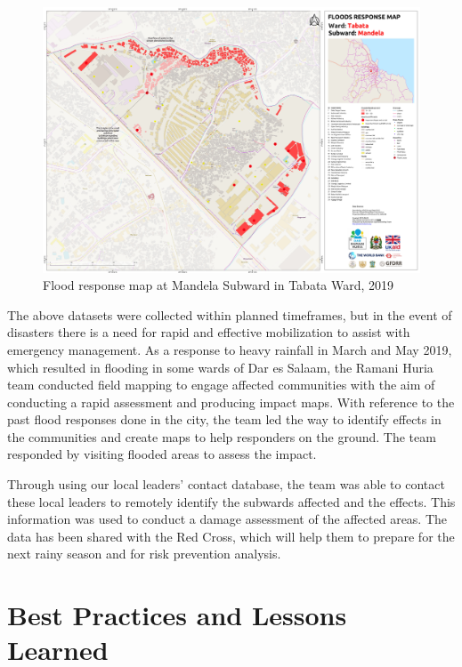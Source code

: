 \documentclass[a4paper,12pt,twoside]{article}
\begin{document}
\begin{figure}[h]
    \centering
    \includegraphics[width=.9\textwidth]{images/mandelaexample.PNG}
    \caption{Flood response map at Mandela Subward in Tabata Ward, 2019}
\end{figure}
\begin{multicols}{2}
The above datasets were collected within planned timeframes, but in  the event of disasters there is a need for rapid and effective mobilization to assist with emergency management.
As a response to heavy rainfall in March and May 2019, which resulted in flooding in some wards of Dar es Salaam, the Ramani Huria team conducted field mapping to engage affected communities with the aim of conducting a rapid assessment and producing impact maps. With reference to the past flood responses done in the city, the team led the way to identify effects in the communities and create maps to help responders on the ground. The team responded by visiting flooded areas to assess the impact.

Through using our local leaders’ contact database, the team was able to contact these local leaders to remotely identify the subwards affected and the effects.
This information was used to conduct a damage assessment of the affected areas. The data has been shared with the Red Cross, which will help them to prepare for the next rainy season and for risk prevention analysis.
\end{multicols}

\newpage
\section{Best Practices and Lessons Learned}
\end{document}
